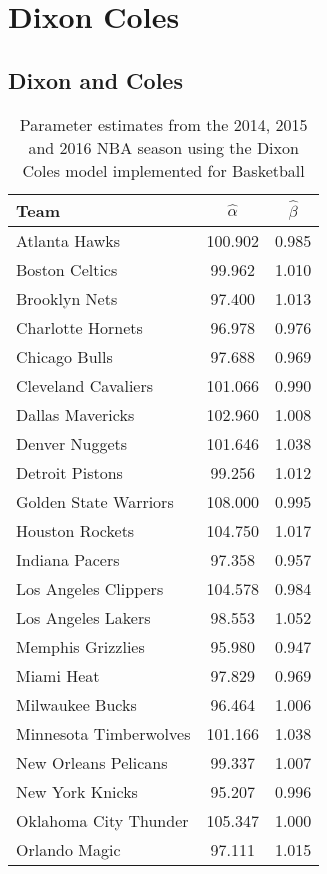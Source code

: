 \chapter{Dixon Coles}


\section{Dixon and Coles}

\begin{table}[t]
\centering
\caption{Parameter estimates from the 2014, 2015 and 2016 NBA season using the Dixon Coles model implemented for Basketball}
\begin{tabular}{|l|c|c|}
\hline
\textbf{Team}  & \textbf{$\hat{\alpha}$} & \textbf{$\hat{\beta}$} \\ \hline
Atlanta Hawks  & 100.902 & 0.985\\ \hline
Boston Celtics & 99.962 & 1.010\\ \hline
Brooklyn Nets  & 97.400 & 1.013\\ \hline
Charlotte Hornets & 96.978 & 0.976\\ \hline
Chicago Bulls & 97.688 & 0.969\\ \hline
Cleveland Cavaliers & 101.066 & 0.990\\ \hline
Dallas Mavericks & 102.960 & 1.008 \\ \hline
Denver Nuggets & 101.646 & 1.038\\ \hline
Detroit Pistons & 99.256 & 1.012\\ \hline
Golden State Warriors & 108.000 & 0.995\\ \hline
Houston Rockets & 104.750 & 1.017 \\ \hline
Indiana Pacers & 97.358 & 0.957 \\ \hline
Los Angeles Clippers & 104.578 & 0.984\\ \hline
Los Angeles Lakers & 98.553 & 1.052 \\ \hline
Memphis Grizzlies & 95.980 & 0.947\\ \hline
Miami Heat & 97.829 & 0.969\\ \hline
Milwaukee Bucks & 96.464 & 1.006\\ \hline
Minnesota Timberwolves & 101.166 & 1.038\\ \hline
New Orleans Pelicans & 99.337 & 1.007\\ \hline
New York Knicks & 95.207 & 0.996\\ \hline
Oklahoma City Thunder & 105.347 & 1.000\\ \hline
Orlando Magic & 97.111 & 1.015\\ \hline

\end{tabular}
\end{table}
